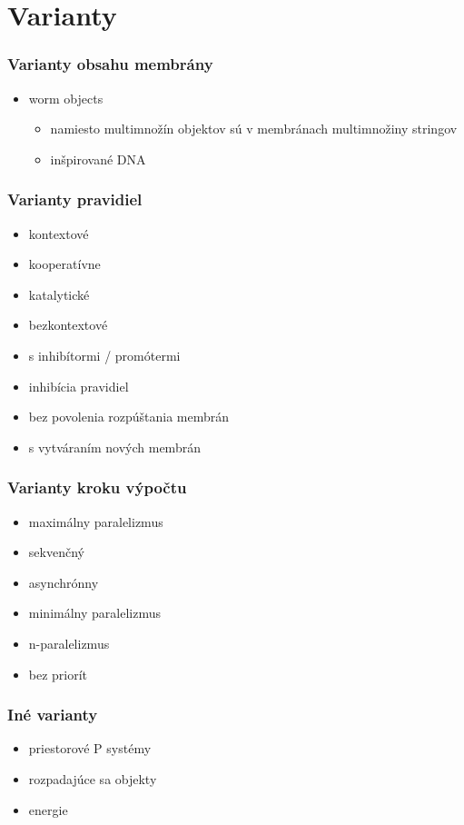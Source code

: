 \documentclass{beamer}
\begin{document}

\section{Varianty} %
\label{sec:varianty}

\begin{frame}[t]\frametitle{Varianty obsahu membrány}
\begin{itemize}
  \item worm objects
  \begin{itemize}
    \item namiesto multimnožín objektov sú v membránach multimnožiny stringov
    \item inšpirované DNA
  \end{itemize}
\end{itemize}
\end{frame}

\begin{frame}[t]\frametitle{Varianty pravidiel}
\begin{itemize}
  \item kontextové
  \item kooperatívne
  \item katalytické
  \item bezkontextové
  \item s inhibítormi / promótermi
  \item inhibícia pravidiel
  \item bez povolenia rozpúštania membrán
  \item s vytváraním nových membrán
\end{itemize}
\end{frame}

\begin{frame}[t]\frametitle{Varianty kroku výpočtu}
\begin{itemize}
  \item maximálny paralelizmus
  \item sekvenčný
  \item asynchrónny
  \item minimálny paralelizmus
  \item n-paralelizmus
  \item bez priorít
\end{itemize}
\end{frame}

\begin{frame}[t]\frametitle{Iné varianty}
\begin{itemize}
  \item priestorové P systémy
  \item rozpadajúce sa objekty
  \item energie
\end{itemize}
\end{frame}
\end{document}
